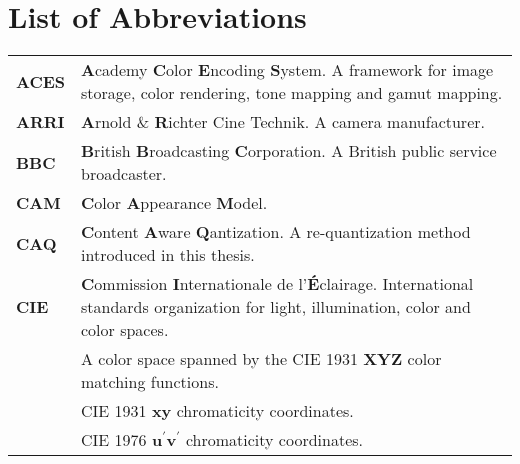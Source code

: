 \chapter*{List of Abbreviations}
%
\begin{flushleft}
%
%





\renewcommand*{\arraystretch}{1.75}
\begin{longtable}[c]{@{}p{28.5mm}@{} p{120.5mm}}
	\textbf{ACES}	& \textbf{A}cademy \textbf{C}olor \textbf{E}ncoding \textbf{S}ystem. A framework for image storage, color rendering, tone mapping and gamut mapping.\\
	\textbf{ARRI}	& \textbf{A}rnold \& \textbf{R}ichter Cine Technik. A camera manufacturer.\\
	\textbf{BBC}    & \textbf{B}ritish \textbf{B}roadcasting \textbf{C}orporation. A British public service broadcaster.\\
	\textbf{CAM}	& \textbf{C}olor \textbf{A}ppearance \textbf{M}odel.\\
	\textbf{CAQ}	& \textbf{C}ontent \textbf{A}ware \textbf{Q}antization. A re-quantization method introduced in this thesis.\\
	\textbf{CIE}	& \textbf{C}ommission \textbf{I}nternationale de l'\textbf{É}clairage. International standards organization for light, illumination, color and color spaces.\\
	\textbf{\XYZ}	& A color space spanned by the CIE 1931 \textbf{XYZ} color matching functions.\\
	\textbf{\xy}	& CIE 1931 \textbf{xy} chromaticity coordinates.\\
	\textbf{\uv}	& CIE 1976 \textbf{u$^\prime$v$^\prime$} chromaticity coordinates.\\

\end{longtable}
\end{flushleft}
